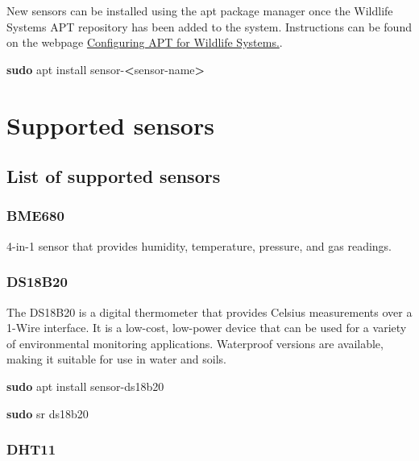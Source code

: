 \documentclass[
]{book}
\newenvironment{Shaded}{\begin{snugshade}}{\end{snugshade}}
\newcommand{\FunctionTok}[1]{\textcolor[rgb]{0.13,0.29,0.53}{\textbf{#1}}}
\newcommand{\NormalTok}[1]{#1}
\newcommand{\OperatorTok}[1]{\textcolor[rgb]{0.81,0.36,0.00}{\textbf{#1}}}
\begin{document}
New sensors can be installed using the apt package manager once the Wildlife Systems APT repository has been added to the system. Instructions can be found on the webpage \href{https://wildlife.systems/apt-configuration.html}{Configuring APT for Wildlife Systems.}.

\begin{Shaded}
\begin{Highlighting}[]
\FunctionTok{sudo}\NormalTok{ apt install sensor{-}}\OperatorTok{\textless{}}\NormalTok{sensor{-}name}\OperatorTok{\textgreater{}}
\end{Highlighting}
\end{Shaded}

\chapter{Supported sensors}\label{supported-sensors}

\section{List of supported sensors}\label{list-of-supported-sensors}

\subsection{BME680}\label{bme680}

4-in-1 sensor that provides humidity, temperature, pressure, and gas readings.

\subsection{DS18B20}\label{ds18b20}

The DS18B20 is a digital thermometer that provides Celsius measurements over a 1-Wire interface. It is a low-cost, low-power device that can be used for a variety of environmental monitoring applications. Waterproof versions are available, making it suitable for use in water and soils.

\begin{Shaded}
\begin{Highlighting}[]
\FunctionTok{sudo}\NormalTok{ apt install sensor{-}ds18b20}

\FunctionTok{sudo}\NormalTok{ sr ds18b20}
\end{Highlighting}
\end{Shaded}

\subsection{DHT11}\label{dht11}
\end{document}
